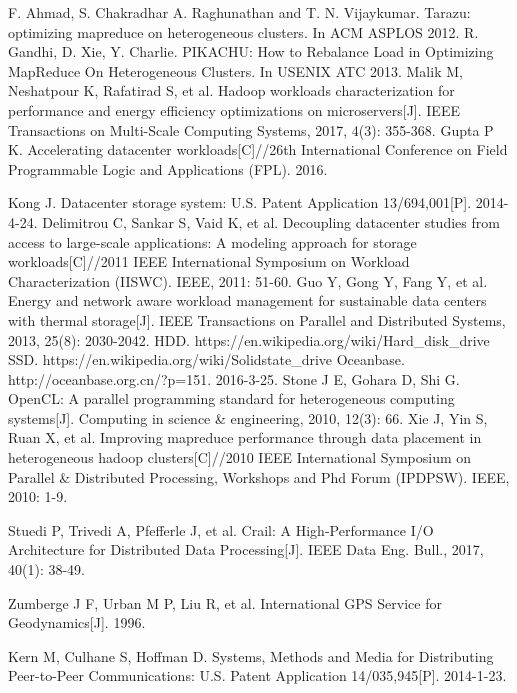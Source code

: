 \documentclass[conference]{IEEEtran}
\begin{document}
\begin{thebibliography}{00}
 F. Ahmad, S. Chakradhar A. Raghunathan and T. N. Vijaykumar. Tarazu: optimizing mapreduce on heterogeneous clusters. In ACM ASPLOS 2012.
 R. Gandhi, D. Xie, Y. Charlie. PIKACHU: How to Rebalance Load in Optimizing MapReduce On Heterogeneous Clusters. In USENIX ATC 2013.
Malik M, Neshatpour K, Rafatirad S, et al. Hadoop workloads characterization for performance and energy efficiency optimizations on microservers[J]. IEEE Transactions on Multi-Scale Computing Systems, 2017, 4(3): 355-368.
Gupta P K. Accelerating datacenter workloads[C]//26th International Conference on Field Programmable Logic and Applications (FPL). 2016.

Kong J. Datacenter storage system: U.S. Patent Application 13/694,001[P]. 2014-4-24.
Delimitrou C, Sankar S, Vaid K, et al. Decoupling datacenter studies from access to large-scale applications: A modeling approach for storage workloads[C]//2011 IEEE International Symposium on Workload Characterization (IISWC). IEEE, 2011: 51-60.
Guo Y, Gong Y, Fang Y, et al. Energy and network aware workload management for sustainable data centers with thermal storage[J]. IEEE Transactions on Parallel and Distributed Systems, 2013, 25(8): 2030-2042.
 HDD. https://en.wikipedia.org/wiki/Hard\_disk\_drive
 SSD. https://en.wikipedia.org/wiki/Solid\-state\_drive
 Oceanbase. http://oceanbase.org.cn/?p=151. 2016-3-25.
Stone J E, Gohara D, Shi G. OpenCL: A parallel programming standard for heterogeneous computing systems[J]. Computing in science \& engineering, 2010, 12(3): 66.
Xie J, Yin S, Ruan X, et al. Improving mapreduce performance through data placement in heterogeneous hadoop clusters[C]//2010 IEEE International Symposium on Parallel \& Distributed Processing, Workshops and Phd Forum (IPDPSW). IEEE, 2010: 1-9.

Stuedi P, Trivedi A, Pfefferle J, et al. Crail: A High-Performance I/O Architecture for Distributed Data Processing[J]. IEEE Data Eng. Bull., 2017, 40(1): 38-49.

Zumberge J F, Urban M P, Liu R, et al. International GPS Service for Geodynamics[J]. 1996.

Kern M, Culhane S, Hoffman D. Systems, Methods and Media for Distributing Peer-to-Peer Communications: U.S. Patent Application 14/035,945[P]. 2014-1-23.
\end{thebibliography}
\end{document}
